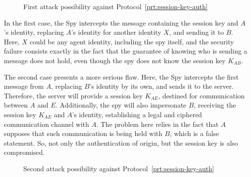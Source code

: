 \begin{figure}[ht]\label{fig:auth-attack1}
  \centering
  \caption{First attack possibility against Protocol~\ref{prt:session-key-auth}}
\end{figure}

In the first case, the Spy intercepts the message containing the session key and \(A\)'s identity, replacing \(A\)'s identity for another identity \(X\), and sending it to \(B\). Here, \(X\) could be any agent identity, including the spy itself, and the security failure consists exactly in the fact that the guarantee of knowing who is sending a message does not hold, even though the spy does not know the session key \(K_{AB}\).

The second case presents a more serious flaw. Here, the Spy intercepts the first message from \(A\), replacing \(B\)'s identity by its own, and sends it to the server. Therefore, the server will provide a session key \(K_{AE}\), destined for communication between \(A\) and \(E\). Additionally, the spy will also impersonate \(B\), receiving the session key \(K_{AE}\) and \(A\)'s identity, establishing a legal and ciphered communication channel with \(A\). The problem here relies in the fact that \(A\) supposes that such communication is being held with \(B\), which is a false statement. So, not only the authentication of origin, but the session key is also compromised.

\begin{figure}[ht]\label{fig:auth-attack2}
  \centering

  \caption{Second attack possibility against Protocol~\ref{prt:session-key-auth}}
\end{figure}

